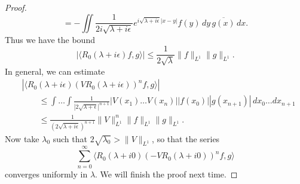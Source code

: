 \begin{proof}
\[    = -\iint \frac{1}{2i \sqrt{\lambda + i\epsilon}} e^{i\sqrt{\lambda + i\epsilon} |x - y|} f(y)\, dy\, \overline{g(x)}\, dx.
  \]
  Thus we have the bound
  \[
    |\langle R_0(\lambda + i\epsilon) f, g \rangle|
    \le \frac{1}{2 \sqrt{\lambda}} \|f\|_{L^1} \|g\|_{L^1}.
  \]
  In general, we can estimate
  \begin{align*}
    &|\langle R_0(\lambda + i\epsilon)(VR_0(\lambda + i\epsilon))^n f, g \rangle| \\
    &\quad \quad \le \int \dots \int \frac{1}{|2\sqrt{\lambda + \epsilon}|^{n + 1}} |V(x_1) \dots V(x_n)| |f(x_0)| |g(x_{n + 1})|\, dx_0 \dots dx_{n + 1} \\
    &\quad \quad \le \frac{1}{(2\sqrt{\lambda + i\epsilon})^{n + 1}} \|V \|_{L^1}^n \|f\|_{L^1} \|g\|_{L^1}.
  \end{align*}
  Now take $\lambda_0$ such that $2\sqrt{\lambda_0} > \|V\|_{L^1}$, so that the series
  \[
    \sum_{n = 0}^\infty \langle R_0(\lambda + i 0) (-V R_0(\lambda + i 0))^n f, g \rangle
  \]
  converges uniformly in $\lambda$. We will finish the
  proof next time.
\end{proof}
